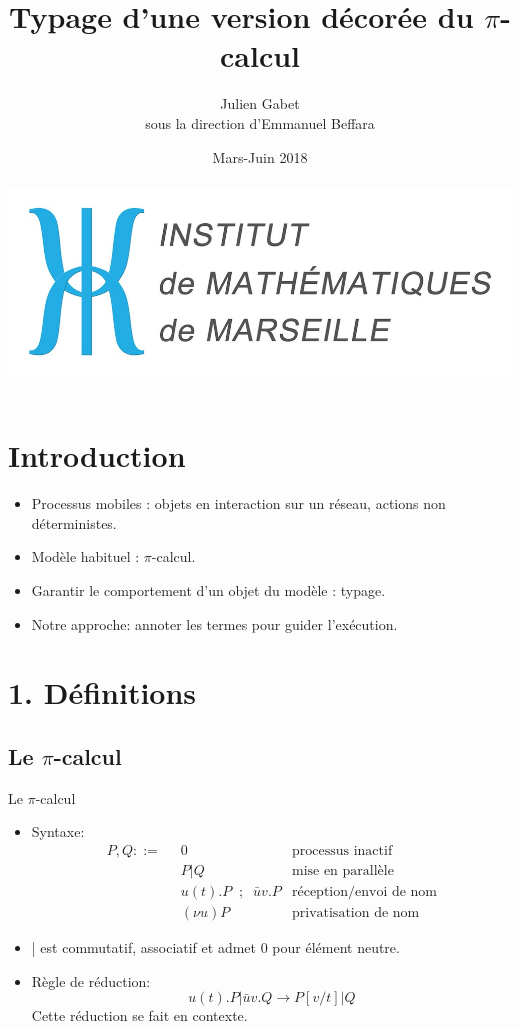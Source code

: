 \documentclass[11pt]{beamer}
\author{Julien Gabet\\
sous la direction d'Emmanuel Beffara}
\title{Typage d'une version décorée du $\pi$-calcul}
\institute{Institut de Mathématiques de Marseille}
\date{Mars-Juin 2018\\~\\
\includegraphics[scale=0.1]{institutMathMarseille.jpg}}
\begin{document}
\begin{frame}
\titlepage
\end{frame}


\begin{frame}
\tableofcontents
\end{frame}

\section{Introduction}

\begin{frame}
\begin{itemize}
\item Processus mobiles : objets en interaction sur un réseau, actions non déterministes.
\item Modèle habituel : $\pi$-calcul.
\item Garantir le comportement d'un objet du modèle : typage.
\item Notre approche: annoter les termes pour guider l'exécution.
\end{itemize}
\end{frame}

\section{1. Définitions}
\subsection{Le $\pi$-calcul}

\begin{frame}{Le $\pi$-calcul}
\begin{itemize}
\item Syntaxe:
\begin{align*}
P,Q::=\;\; & 0 & \text{processus inactif}\\
& P\bigl|Q & \text{mise en parallèle}\\
& u(t).P\;\;;\;\;\bar{u}v.P & \text{réception/envoi de nom}\\
& (\nu u)P & \text{privatisation de nom}
\end{align*}
\pause\item | est commutatif, associatif et admet 0 pour élément neutre.
\pause\item Règle de réduction:
\[u(t).P\bigl|\bar{u}v.Q\to P[v/t]|Q\]
Cette réduction se fait en contexte.
\end{itemize}
\end{frame}
\end{document}
